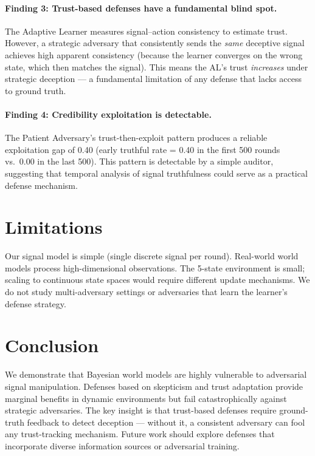 \documentclass[11pt,letterpaper]{article}
\begin{document}
\paragraph{Finding 3: Trust-based defenses have a fundamental blind spot.}
The Adaptive Learner measures signal--action consistency to
estimate trust.  However, a strategic adversary that consistently
sends the \emph{same} deceptive signal achieves high apparent
consistency (because the learner converges on the wrong state, which
then matches the signal).  This means the AL's trust \emph{increases}
under strategic deception --- a fundamental limitation of any defense
that lacks access to ground truth.

\paragraph{Finding 4: Credibility exploitation is detectable.}
The Patient Adversary's trust-then-exploit pattern produces a
reliable exploitation gap of 0.40 (early truthful rate = 0.40 in the
first 500 rounds vs.\ 0.00 in the last 500).  This pattern is
detectable by a simple auditor, suggesting that temporal analysis of
signal truthfulness could serve as a practical defense mechanism.

\section{Limitations}

Our signal model is simple (single discrete signal per round).
Real-world world models process high-dimensional observations.  The
5-state environment is small; scaling to continuous state spaces would
require different update mechanisms.  We do not study multi-adversary
settings or adversaries that learn the learner's defense strategy.

\section{Conclusion}

We demonstrate that Bayesian world models are highly vulnerable to
adversarial signal manipulation.  Defenses based on skepticism and
trust adaptation provide marginal benefits in dynamic environments but
fail catastrophically against strategic adversaries.  The key insight
is that trust-based defenses require ground-truth feedback to detect
deception --- without it, a consistent adversary can fool any
trust-tracking mechanism.  Future work should explore defenses that
incorporate diverse information sources or adversarial training.
\end{document}
